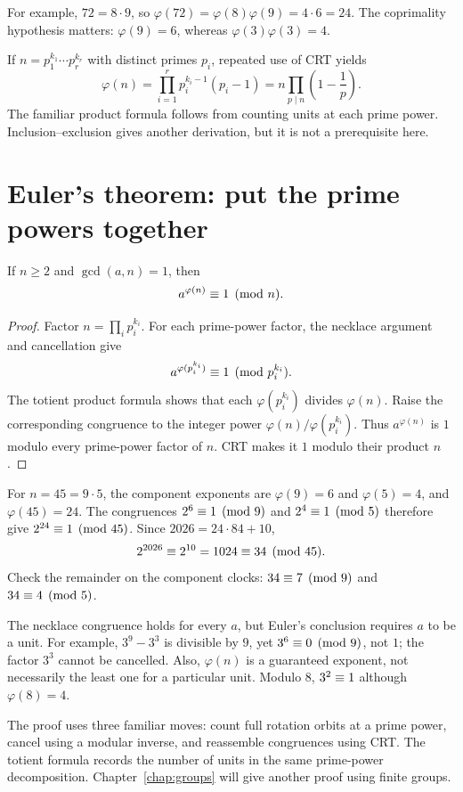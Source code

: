 For example, $72=8\cdot9$, so $\varphi(72)=\varphi(8)\varphi(9)=4\cdot6=24$.
The coprimality hypothesis matters: $\varphi(9)=6$, whereas
$\varphi(3)\varphi(3)=4$.

If $n=p_1^{k_1}\cdots p_r^{k_r}$ with distinct primes $p_i$, repeated
use of CRT yields
\[
 \varphi(n)=\prod_{i=1}^r p_i^{k_i-1}(p_i-1)
           =n\prod_{p\mid n}\left(1-\frac1p\right).
\]
The familiar product formula follows from counting units at each
prime power. Inclusion--exclusion gives another derivation, but it
is not a prerequisite here.

\section{Euler's theorem: put the prime powers together}
\label{sec:euler-crt}

\begin{theorem}
\label{thm:euler-necklaces}
If $n\ge2$ and $\gcd(a,n)=1$, then
\[
 a^{\varphi(n)}\equiv1\pmod n.
\]
\end{theorem}
\begin{proof}
Factor $n=\prod_i p_i^{k_i}$. For each prime-power factor, the necklace
argument and cancellation give
\[
 a^{\varphi(p_i^{k_i})}\equiv1\pmod{p_i^{k_i}}.
\]
The totient product formula shows that each $\varphi(p_i^{k_i})$
divides $\varphi(n)$. Raise the corresponding congruence to the integer
power $\varphi(n)/\varphi(p_i^{k_i})$. Thus $a^{\varphi(n)}$ is $1$
modulo every prime-power factor of $n$. CRT makes it $1$ modulo their
product $n$.
\end{proof}

\begin{example}
For $n=45=9\cdot5$, the component exponents are $\varphi(9)=6$ and
$\varphi(5)=4$, and $\varphi(45)=24$. The congruences
$2^6\equiv1\pmod9$ and $2^4\equiv1\pmod5$ therefore give
$2^{24}\equiv1\pmod{45}$. Since $2026=24\cdot84+10$,
\[
 2^{2026}\equiv2^{10}=1024\equiv34\pmod{45}.
\]
Check the remainder on the component clocks: $34\equiv7\pmod9$
and $34\equiv4\pmod5$.
\end{example}

\begin{warningbox}
The necklace congruence holds for every $a$, but Euler's conclusion
requires $a$ to be a unit. For example, $3^9-3^3$ is divisible by $9$,
yet $3^6\equiv0\pmod9$, not $1$; the factor $3^3$ cannot be cancelled.
Also, $\varphi(n)$ is a guaranteed exponent, not necessarily the least
one for a particular unit. Modulo $8$, $3^2\equiv1$ although
$\varphi(8)=4$.
\end{warningbox}

\begin{checkpoint}
The proof uses three familiar moves: count full rotation orbits at a
prime power, cancel using a modular inverse, and reassemble congruences
using CRT. The totient formula records the number of units in the same
prime-power decomposition. Chapter~\ref{chap:groups} will give another
proof using finite groups.
\end{checkpoint}
